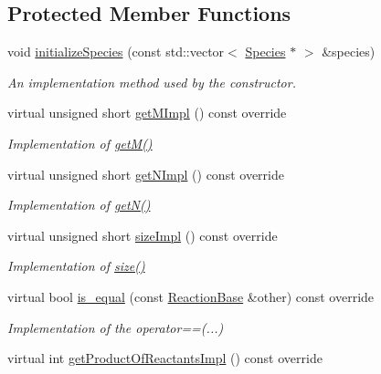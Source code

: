 \subsection*{Protected Member Functions}
\begin{DoxyCompactItemize}
\item 
void \hyperlink{classchem_1_1Reaction_a663351786385d539a036f27e3b235808}{initialize\-Species} (const std\-::vector$<$ \hyperlink{classchem_1_1Species}{Species} $\ast$ $>$ \&species)
\begin{DoxyCompactList}\small\item\em An implementation method used by the constructor. \end{DoxyCompactList}\item 
virtual unsigned short \hyperlink{classchem_1_1Reaction_af3bdc92ce10377c7847855876e6d7875}{get\-M\-Impl} () const override
\begin{DoxyCompactList}\small\item\em Implementation of \hyperlink{classchem_1_1ReactionBase_a9b4f167efdd3307f0082c1e8e4ec537a}{get\-M()} \end{DoxyCompactList}\item 
virtual unsigned short \hyperlink{classchem_1_1Reaction_ad7170f4e147a955af31831007e9b90e9}{get\-N\-Impl} () const override
\begin{DoxyCompactList}\small\item\em Implementation of \hyperlink{classchem_1_1ReactionBase_ade08c8ab247efe988ebfe271b5876b98}{get\-N()} \end{DoxyCompactList}\item 
virtual unsigned short \hyperlink{classchem_1_1Reaction_a8457d6c276b11ed0d12a1ff2ef4f9f50}{size\-Impl} () const override
\begin{DoxyCompactList}\small\item\em Implementation of \hyperlink{classchem_1_1ReactionBase_a2d93483578ab0d29a2ec09920e7eeb94}{size()} \end{DoxyCompactList}\item 
virtual bool \hyperlink{classchem_1_1Reaction_a441aebc6e42ecd5e9bbf08a4523ed340}{is\-\_\-equal} (const \hyperlink{classchem_1_1ReactionBase}{Reaction\-Base} \&other) const override
\begin{DoxyCompactList}\small\item\em Implementation of the operator==(...) \end{DoxyCompactList}\item 
virtual int \hyperlink{classchem_1_1Reaction_a764121bff008343f73d1bc701dafa9a6}{get\-Product\-Of\-Reactants\-Impl} () const override

\end{DoxyCompactItemize}
